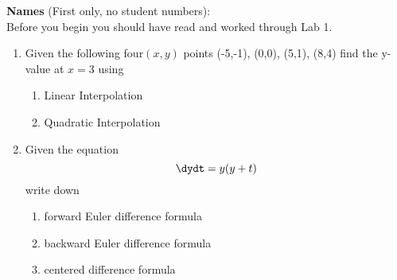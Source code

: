 \documentclass[12pt]{article}
\begin{document}
{\bf Names} (First only, no student numbers):\\


Before you begin you should have read and worked through Lab 1.


\begin{enumerate}
\item Given the following four$ (x,y)$ points (-5,-1), (0,0), (5,1),
  (8,4) find the y-value at $x=3$ using
\begin{enumerate}
\item Linear Interpolation 
\vspace{2in}
\item Quadratic Interpolation
\vspace{2in}
\end{enumerate}
\item Given the equation
\begin{equation}
\dydt = y(y+t)
\end{equation}
write down
\begin{enumerate}
\item forward Euler difference formula
\vspace{0.5in}
\item backward Euler difference formula
\vspace{0.5in}
\item centered difference formula
\end{enumerate}

\end{enumerate}
\end{document}
